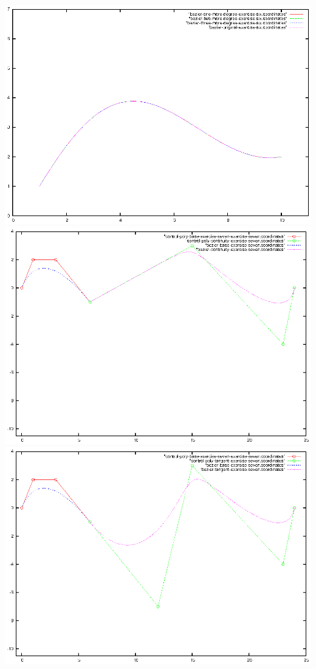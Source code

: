 \documentclass{article}
\begin{document}
\includegraphics{bezier-deCasteljau-curves/exercise-six-one-more-degree-comparison}
\includegraphics{bezier-deCasteljau-curves/exercise-seven-continuity}
\includegraphics{bezier-deCasteljau-curves/exercise-seven-tangent}
\end{document}
